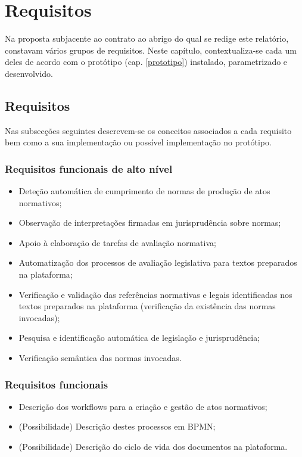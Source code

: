 \chapter{Requisitos}
\label{requisitos}

Na proposta subjacente ao contrato ao abrigo do qual se redige este relatório, constavam vários grupos de requisitos.
Neste capítulo, contextualiza-se cada um deles de acordo com o protótipo (cap. \ref{prototipo}) instalado, parametrizado 
e desenvolvido.

\section{Requisitos}

Nas subsecções seguintes descrevem-se os conceitos associados a cada requisito bem como a sua implementação ou possível 
implementação no protótipo.

\subsection{Requisitos funcionais de alto nível}

\begin{itemize}
\item Deteção automática de cumprimento de normas de produção de atos normativos;
\item Observação de interpretações firmadas em jurisprudência sobre normas;
\item Apoio à elaboração de tarefas de avaliação normativa;
\item Automatização dos processos de avaliação legislativa para textos preparados na plataforma;
\item Verificação e validação das referências normativas e legais identificadas nos textos preparados
na plataforma (verificação da existência das normas invocadas);
\item Pesquisa e identificação automática de legislação e jurisprudência;
\item Verificação semântica das normas invocadas.
\end{itemize}

\subsection{Requisitos funcionais}

\begin{itemize}
\item Descrição dos workflows para a criação e gestão de atos normativos;
\item (Possibilidade) Descrição destes processos em BPMN;
\item (Possibilidade) Descrição do ciclo de vida dos documentos na plataforma.
\end{itemize}

